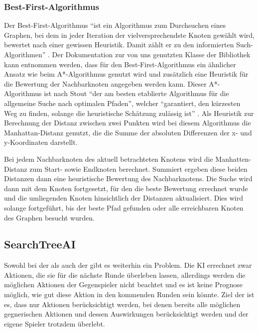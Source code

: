 \subsubsection*{Best-First-Algorithmus}
\label{subsubsec:best-first-algorithm}

Der Best-First-Algorithmus "`ist ein Algorithmus zum Durchsuchen eines Graphen, bei dem in jeder Iteration der
vielversprechendste Knoten gewählt wird, bewertet nach einer gewissen Heuristik.
Damit zählt er zu den informierten Such-Algorithmen"' .
Der Dokumentation zur von uns genutzten Klasse  der Bibliothek  kann entnommen werden,
dass für den Best-First-Algorithmus ein ähnlicher Ansatz wie beim A*-Algorithmus genutzt wird und zusätzlich eine
Heuristik für die Bewertung der Nachbarknoten angegeben werden kann. 
Dieser A*-Algorithmus ist nach Stout "`der am besten etablierte Algorithmus für die allgemeine Suche nach optimalen
Pfaden"', welcher "`garantiert, den kürzesten Weg zu finden, solange die heuristische Schätzung zulässig ist"'
.
Als Heuristik zur Berechnung der Distanz zwischen zwei Punkten wird bei diesem Algorithmus die Manhattan-Distanz
genutzt, die die Summe der absoluten Differenzen der x- und y-Koordinaten darstellt. 

Bei jedem Nachbarknoten des aktuell betrachteten Knotens wird die Manhatten-Distanz zum Start- sowie Endknoten
berechnet.
Summiert ergeben diese beiden Distanzen dann eine heuristische Bewertung des Nachbarknotens.
Die Suche wird dann mit dem Knoten fortgesetzt, für den die beste Bewertung errechnet wurde und die umliegenden Knoten
hinsichtlich der Distanzen aktualisiert.
Dies wird solange fortgeführt, bis der beste Pfad gefunden oder alle erreichbaren Knoten des Graphen besucht wurden.

\subsection{SearchTreeAI}
\label{subsec:searchtree-ai}

Sowohl bei der  als auch der  gibt es weiterhin ein Problem.
Die \ac{KI} errechnet zwar Aktionen, die sie für die nächste Runde überleben lassen, allerdings werden die möglichen
Aktionen der Gegenspieler nicht beachtet und es ist keine Prognose möglich, wie gut diese Aktion in den kommenden Runden
sein könnte.
Ziel der  ist es, dass nur Aktionen berücksichtigt werden, bei denen bereits alle möglichen
gegnerischen Aktionen und dessen Auswirkungen berücksichtigt werden und der eigene Spieler trotzdem überlebt. \\

